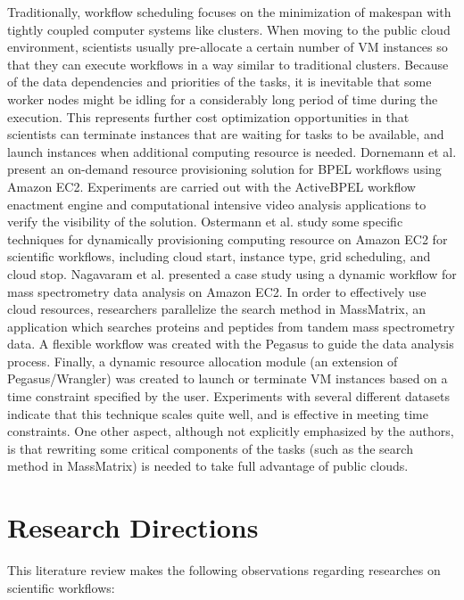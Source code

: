 Traditionally, workflow scheduling focuses on the minimization of makespan with tightly coupled computer systems like clusters. When moving to the public cloud environment, scientists usually pre-allocate a certain number of VM instances so that they can execute workflows in a way similar to traditional clusters. Because of the data dependencies and priorities of the tasks, it is inevitable that some worker nodes might be idling for a considerably long period of time during the execution. This represents further cost optimization opportunities in that scientists can terminate instances that are waiting for tasks to be available, and launch instances when additional computing resource is needed. Dornemann et al. \cite{dornemann2009demand} present an on-demand resource provisioning solution for BPEL workflows using Amazon EC2. Experiments are carried out with the ActiveBPEL workflow enactment engine and computational intensive video analysis applications to verify the visibility of the solution. Ostermann et al. \cite{ostermann2010dynamic} study some specific techniques for dynamically provisioning computing resource on Amazon EC2 for scientific workflows, including cloud start, instance type, grid scheduling, and cloud stop. Nagavaram et al. \cite{nagavaram2011cloud} presented a case study using a dynamic workflow for mass spectrometry data analysis on Amazon EC2. In order to effectively use cloud resources, researchers parallelize the search method in MassMatrix, an application which searches proteins and peptides from tandem mass spectrometry data. A flexible workflow was created with the Pegasus to guide the data analysis process. Finally, a dynamic resource allocation module (an extension of Pegasus/Wrangler) was created to launch or terminate VM instances based on a time constraint specified by the user. Experiments with several different datasets indicate that this technique scales quite well, and is effective in meeting time constraints. One other aspect, although not explicitly emphasized by the authors, is that rewriting some critical components of the tasks (such as the search method in MassMatrix) is needed to take full advantage of public clouds. 


\section{Research Directions}
\label{sec:research_directions}


This literature review makes the following observations regarding researches on scientific workflows:

